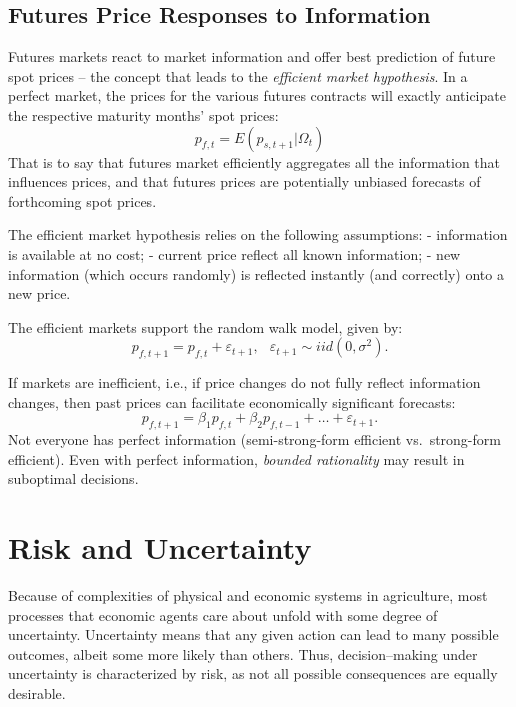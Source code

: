 \documentclass[
]{book}
\begin{document}
\hypertarget{futures-price-responses-to-information}{%
\section{Futures Price Responses to Information}\label{futures-price-responses-to-information}}

Futures markets react to market information and offer best prediction of future spot prices -- the concept that leads to the \emph{efficient market hypothesis}. In a perfect market, the prices for the various futures contracts will exactly anticipate the respective maturity months' spot prices: \[p_{f,t} = E\!\left(p_{s,t+1}|\Omega_t\right)\] That is to say that futures market efficiently aggregates all the information that influences prices, and that futures prices are potentially unbiased forecasts of forthcoming spot prices.

The efficient market hypothesis relies on the following assumptions:
- information is available at no cost;
- current price reflect all known information;
- new information (which occurs randomly) is reflected instantly (and correctly) onto a new price.

The efficient markets support the random walk model, given by: \[p_{f,t+1} = p_{f,t} + \varepsilon_{t+1},\;~~\varepsilon_{t+1}\sim iid\left(0,\sigma^2\right).\]

If markets are inefficient, i.e., if price changes do not fully reflect information changes, then past prices can facilitate economically significant forecasts: \[p_{f,t+1} = \beta_1 p_{f,t} + \beta_2 p_{f,t-1} + \ldots + \varepsilon_{t+1}.\] Not everyone has perfect information (semi-strong-form efficient vs.~strong-form efficient). Even with perfect information, \emph{bounded rationality} may result in suboptimal decisions.

\hypertarget{risk-and-uncertainty}{%
\chapter{Risk and Uncertainty}\label{risk-and-uncertainty}}

Because of complexities of physical and economic systems in agriculture, most processes that economic agents care about unfold with some degree of uncertainty. Uncertainty means that any given action can lead to many possible outcomes, albeit some more likely than others. Thus, decision--making under uncertainty is characterized by risk, as not all possible consequences are equally desirable.
\end{document}
